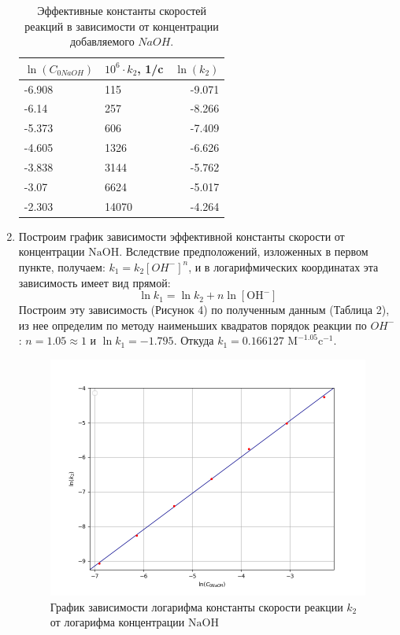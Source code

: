 \documentclass[a4paper,12pt]{article}
\begin{document}
\begin{enumerate}
\begin{table}[h!]
\centering
\begin{tabular}{|l|l|r|}
\hline
$\ln(C_{0NaOH})$ & $10^{6} \cdot k_{2} $, 1/c & \multicolumn{1}{l|}{$\ln ( k_{2}) $} \\ \hline
-6.908           & 115                        & -9.071                               \\ \hline
-6.14            & 257                        & -8.266                               \\ \hline
-5.373           & 606                        & -7.409                               \\ \hline
-4.605           & 1326                       & -6.626                               \\ \hline
-3.838           & 3144                       & -5.762                               \\ \hline
-3.07            & 6624                       & -5.017                               \\ \hline
-2.303           & 14070                      & -4.264                               \\ \hline
\end{tabular}
\caption{Эффективные константы скоростей реакций в зависимости от концентрации добавляемого $NaOH$.}
\label{tab:my-table}
\end{table}



\item Построим график зависимости эффективной константы скорости от концентрации $\mathrm{NaOH}$. Вследствие предположений, изложенных в первом пункте, получаем: $k_1 = k_2[OH^{-}]^n$, и в логарифмических координатах эта зависимость имеет вид прямой:
\[\ln k_{1}=\ln k_{2}+n \ln [\mathrm{OH}^-]\]
Построим эту зависимость (Рисунок 4) по полученным данным (Таблица 2), из нее определим по методу наименьших квадратов порядок реакции по $OH^{-}$: $n=1.05\approx1$ и $\ln k_{1} = -1.795$. Откуда $k_{1} =0.166127 \text{ M}^{-1.05}\text{c}^{-1}$.


\begin{figure}[h!]
\begin{center}
\includegraphics[width = 0.65\linewidth]{conc_1.png}
\end{center}
\caption{График зависимости логарифма константы скорости реакции $k_{2}$ от логарифма концентрации $\mathrm{NaOH}$}
\end{figure}

\end{enumerate}
\end{document}
